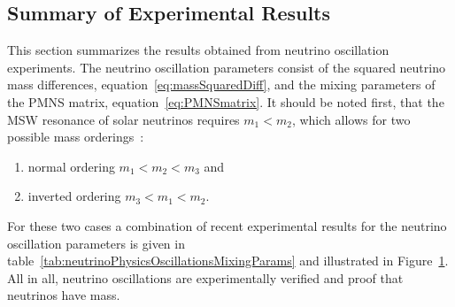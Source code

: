 \subsection{Summary of Experimental Results}
\label{sec:neutrinoPhysicsOscillationsMixingParams}
This section summarizes the results obtained from neutrino oscillation experiments. The neutrino oscillation parameters consist of the squared neutrino mass differences, equation~\eqref{eq:massSquaredDiff}, and the mixing parameters of the PMNS matrix, equation~\eqref{eq:PMNSmatrix}. It should be noted first, that the MSW resonance of solar neutrinos requires $m_1 < m_2$, which allows for two possible mass orderings~\cite{zuber2011neutrino}:
\begin{enumerate}
    \item normal ordering $m_1 < m_2 < m_3$ and
    \item inverted ordering $m_3 < m_1 < m_2$.
\end{enumerate}
For these two cases a combination of recent experimental results for the neutrino oscillation parameters is given in table~\ref{tab:neutrinoPhysicsOscillationsMixingParams} and illustrated in Figure~\ref{fig:neutrinoPhysicsOscillationsMixingParams}. All in all, neutrino oscillations are experimentally verified and proof that neutrinos have mass.
\FloatBarrier
\begin{figure}[t]
	\label{fig:neutrinoPhysicsOscillationsMixingParams}
\end{figure}

